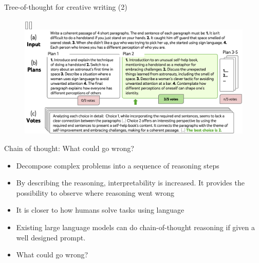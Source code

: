 \begin{vbframe}{Tree-of-thought for creative writing (2)}

\vfill
    
\begin{figure}
\raisebox{0pt}[\height][\depth]{\hspace{-0.85cm}%
    \includegraphics[width=1.15\textwidth]{figure/totcreativebig.png}
}
\end{figure}

\vfill

\end{vbframe}


\begin{frame}{Chain of thought: What could go wrong?}

\vfill

\begin{itemize}
    \item Decompose complex problems into a sequence of reasoning steps
    \item By describing the reasoning, interpretability is increased. It provides the possibility to observe where reasoning went wrong
    \item It is closer to how humans solve tasks using language
    \item Existing large language models can do
    chain-of-thought reasoning if given a well designed prompt.

\item \ques What could go wrong?
\end{itemize}

\vfill

\end{frame}

